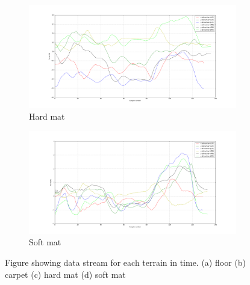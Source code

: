 \documentclass[USenglish]{ifimaster}  %
\begin{document}
	\begin{figure}[h] \ContinuedFloat
		\begin{subfigure}[h]{\textwidth}
			\includegraphics[width=\textwidth,height=\textheight,keepaspectratio]{Figures/s1mykmattetd}
			\caption{Hard mat}
			\label{fig:mattebgraf}
		\end{subfigure}
		\begin{subfigure}[b]{\textwidth}
			\includegraphics[width=\textwidth,height=\textheight,keepaspectratio]{Figures/s1hardmattetd}
			\caption{Soft mat}
			\label{fig:mykmattegraf}
		\end{subfigure}
		
		
		
		\caption[]{Figure showing data stream for each terrain in time. (a) floor (b) carpet (c) hard mat (d) soft mat }
		\label{fig:gtmgraf}
	\end{figure}
	
	\FloatBarrier
	
\end{document}
